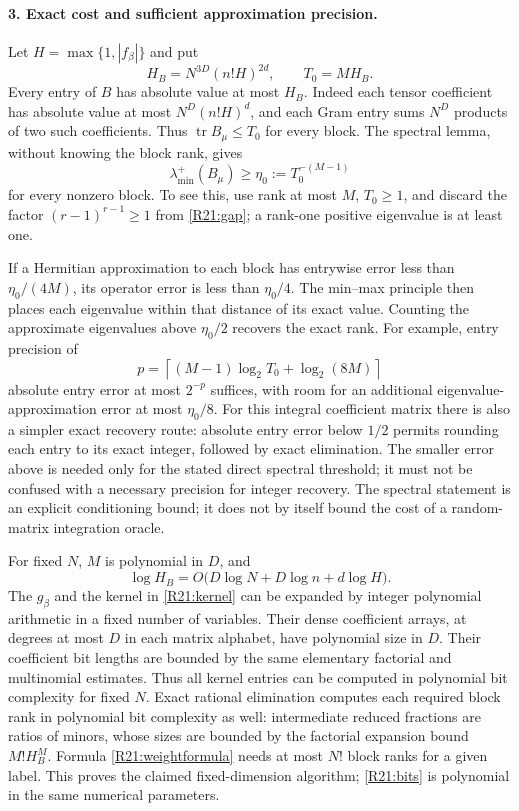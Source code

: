 \paragraph{3. Exact cost and sufficient approximation precision.}
Let $H=\max\{1,|f_\beta|\}$ and put
\[
 H_B=N^{3D}(n!H)^{2d},\qquad T_0=MH_B.
\]
Every entry of $B$ has absolute value at most $H_B$.
Indeed each tensor coefficient has absolute value at most
$N^D(n!H)^d$, and each Gram entry sums $N^D$ products of two such
coefficients. Thus $\operatorname{tr}B_\mu\leq T_0$ for every block.
The spectral lemma, without knowing the block rank, gives
\begin{equation}\label{R21:uniformgap}
 \lambda_{\min}^{+}(B_\mu)\geq
 \eta_0:=T_0^{-(M-1)}
\end{equation}
for every nonzero block. To see this, use rank at most $M$,
$T_0\geq1$, and discard the factor $(r-1)^{r-1}\geq1$ from
\eqref{R21:gap}; a rank-one positive eigenvalue is at least one.

If a Hermitian approximation to each block has entrywise error
less than $\eta_0/(4M)$, its operator error is less than
$\eta_0/4$. The min--max principle then places each eigenvalue
within that distance of its exact value. Counting the approximate
eigenvalues above $\eta_0/2$ recovers the exact rank. For example,
entry precision of
\begin{equation}\label{R21:bits}
 p=\left\lceil (M-1)\log_2T_0+\log_2(8M)\right\rceil
\end{equation}
absolute entry error at most $2^{-p}$ suffices, with room for an
additional eigenvalue-approximation error at most $\eta_0/8$. For this integral coefficient matrix there is also a simpler exact
recovery route: absolute entry error below $1/2$ permits rounding each
entry to its exact integer, followed by exact elimination. The smaller
error above is needed only for the stated direct spectral threshold;
it must not be confused with a necessary precision for integer recovery.
The spectral statement is an explicit conditioning bound; it does not by itself bound the cost of a
random-matrix integration oracle.

For fixed $N$, $M$ is polynomial in $D$, and
\[
 \log H_B=O\bigl(D\log N+D\log n+d\log H\bigr).
\]
The $g_\beta$ and the kernel in \eqref{R21:kernel} can be expanded
by integer polynomial arithmetic in a fixed number of variables.
Their dense coefficient arrays, at degrees at most $D$ in each
matrix alphabet, have polynomial size in $D$.
Their coefficient bit lengths are bounded by the same elementary
factorial and multinomial estimates. Thus all kernel entries can
be computed in polynomial bit complexity for fixed $N$.
Exact rational elimination computes each required block rank in
polynomial bit complexity as well: intermediate reduced fractions
are ratios of minors, whose sizes are bounded by the factorial
expansion bound $M!H_B^M$. Formula \eqref{R21:weightformula} needs
at most $N!$ block ranks for a given label. This proves the claimed
fixed-dimension algorithm; \eqref{R21:bits} is polynomial in the
same numerical parameters.

